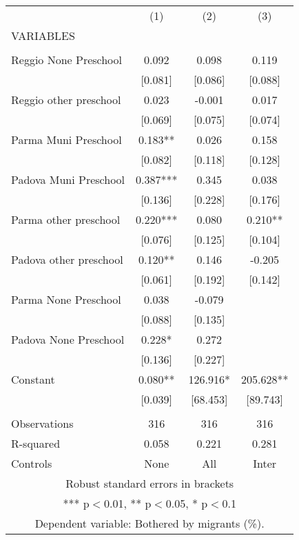 \begin{tabular}{lccc} \hline
 & (1) & (2) & (3) \\
VARIABLES &  &  &  \\ \hline
 &  &  &  \\
Reggio None Preschool & 0.092 & 0.098 & 0.119 \\
 & [0.081] & [0.086] & [0.088] \\
Reggio other preschool & 0.023 & -0.001 & 0.017 \\
 & [0.069] & [0.075] & [0.074] \\
Parma Muni Preschool & 0.183** & 0.026 & 0.158 \\
 & [0.082] & [0.118] & [0.128] \\
Padova Muni Preschool & 0.387*** & 0.345 & 0.038 \\
 & [0.136] & [0.228] & [0.176] \\
Parma other preschool & 0.220*** & 0.080 & 0.210** \\
 & [0.076] & [0.125] & [0.104] \\
Padova other preschool & 0.120** & 0.146 & -0.205 \\
 & [0.061] & [0.192] & [0.142] \\
Parma None Preschool & 0.038 & -0.079 &  \\
 & [0.088] & [0.135] &  \\
Padova None Preschool & 0.228* & 0.272 &  \\
 & [0.136] & [0.227] &  \\
Constant & 0.080** & 126.916* & 205.628** \\
 & [0.039] & [68.453] & [89.743] \\
 &  &  &  \\
Observations & 316 & 316 & 316 \\
R-squared & 0.058 & 0.221 & 0.281 \\
 Controls & None & All & Inter \\ \hline
\multicolumn{4}{c}{ Robust standard errors in brackets} \\
\multicolumn{4}{c}{ *** p$<$0.01, ** p$<$0.05, * p$<$0.1} \\
\multicolumn{4}{c}{ Dependent variable: Bothered by migrants (\%).} \\
\end{tabular}
